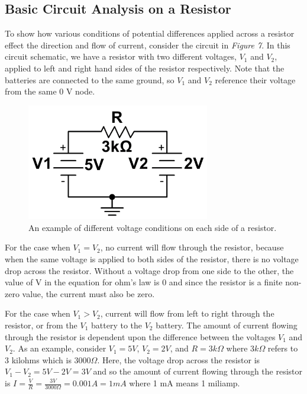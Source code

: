 \documentclass[12pt]{article}
\begin{document}
\subsection{Basic Circuit Analysis on a Resistor}

To show how various conditions of potential differences applied across a resistor effect the direction and flow of current, consider the circuit in \textit{Figure 7}. In this circuit schematic, we have a resistor with two different voltages, $V_1$ and $V_2$, applied to left and right hand sides of the resistor respectively. Note that the batteries are connected to the same ground, so $V_1$ and $V_2$ reference their voltage from the same 0 V node. 

\begin{figure}[h]
    \centering
    \includegraphics[width=8cm]{photos/prelim/circuitschmeatic2.PNG}
    \caption{An example of different voltage conditions on each side of a resistor.}
\end{figure}

For the case when $V_1 = V_2$, no current will flow through the resistor, because when the same voltage is applied to both sides of the resistor, there is no voltage drop across the resistor. Without a voltage drop from one side to the other, the value of V in the equation for ohm's law is 0 and since the resistor is a finite non-zero value, the current must also be zero.

For the case when $V_1 > V_2$, current will flow from left to right through the resistor, or from the $V_1$ battery to the $V_2$ battery. The amount of current flowing through the resistor is dependent upon the difference between the voltages $V_1$ and $V_2$. As an example, consider $V_1 = 5V$, $V_2 = 2V$, and $R = 3k\Omega$ where $3k\Omega$ refers to 3 kilohms which is $3000\Omega$. Here, the voltage drop across the resistor is $V_1 - V_2 = 5V - 2V = 3V$ and so the amount of current flowing through the resistor is $I = \frac{V}{R} = \frac{3V}{3000\Omega} = 0.001 A = 1 mA$ where 1 mA means 1 miliamp. 
\end{document}
